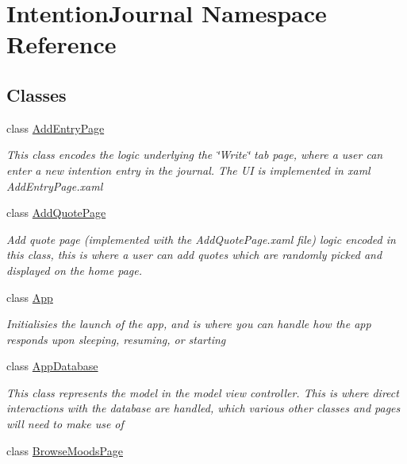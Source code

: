 \hypertarget{namespace_intention_journal}{}\section{Intention\+Journal Namespace Reference}
\label{namespace_intention_journal}
\subsection*{Classes}
\begin{DoxyCompactItemize}
\item 
class \hyperlink{class_intention_journal_1_1_add_entry_page}{Add\+Entry\+Page}
\begin{DoxyCompactList}\small\item\em This class encodes the logic underlying the \char`\"{}\+Write\char`\"{} tab page, where a user can enter a new intention entry in the journal. The UI is implemented in xaml Add\+Entry\+Page.\+xaml \end{DoxyCompactList}\item 
class \hyperlink{class_intention_journal_1_1_add_quote_page}{Add\+Quote\+Page}
\begin{DoxyCompactList}\small\item\em Add quote page (implemented with the Add\+Quote\+Page.\+xaml file) logic encoded in this class, this is where a user can add quotes which are randomly picked and displayed on the home page. \end{DoxyCompactList}\item 
class \hyperlink{class_intention_journal_1_1_app}{App}
\begin{DoxyCompactList}\small\item\em Initialisies the launch of the app, and is where you can handle how the app responds upon sleeping, resuming, or starting \end{DoxyCompactList}\item 
class \hyperlink{class_intention_journal_1_1_app_database}{App\+Database}
\begin{DoxyCompactList}\small\item\em This class represents the model in the model view controller. This is where direct interactions with the database are handled, which various other classes and pages will need to make use of \end{DoxyCompactList}\item 
class \hyperlink{class_intention_journal_1_1_browse_moods_page}{Browse\+Moods\+Page}

\end{DoxyCompactItemize}
